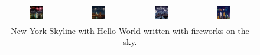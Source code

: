 \begin{figure}[ht!]
\begin{tabular}{cccc}
        \includegraphics[width=0.24\textwidth]{figures/cross/helloworld_0.jpg} &
        \includegraphics[width=0.24\textwidth]{figures/cross/helloworld_1.jpg} &
        \includegraphics[width=0.24\textwidth]{figures/cross/helloworld_2.jpg} &
        \includegraphics[width=0.24\textwidth]{figures/cross/helloworld_3.jpg} \vspace{-1mm}\\
        \multicolumn{4}{c}{\small New York Skyline with Hello World written with fireworks on the sky.}\\


\end{tabular}
\end{figure}
